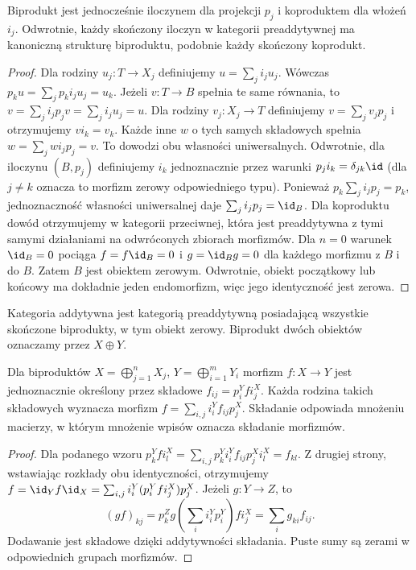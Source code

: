 \begin{twierdzenie}\label{cat:thm:biproduct-universal}
Biprodukt jest jednocześnie iloczynem dla projekcji $p_j$ i koproduktem dla włożeń $i_j$. Odwrotnie, każdy skończony iloczyn w kategorii preaddytywnej ma kanoniczną strukturę biproduktu, podobnie każdy skończony koprodukt.
\end{twierdzenie}
\begin{proof}
Dla rodziny $u_j:T\to X_j$ definiujemy $u=\sum_j i_ju_j$. Wówczas $p_ku=\sum_j p_ki_ju_j=u_k$. Jeżeli $v:T\to B$ spełnia te same równania, to $v=\sum_j i_jp_jv=\sum_j i_ju_j=u$. Dla rodziny $v_j:X_j\to T$ definiujemy $v=\sum_j v_jp_j$ i otrzymujemy $vi_k=v_k$. Każde inne $w$ o tych samych składowych spełnia $w=\sum_j wi_jp_j=v$. To dowodzi obu własności uniwersalnych.
Odwrotnie, dla iloczynu $(B,p_j)$ definiujemy $i_k$ jednoznacznie przez warunki $p_ji_k=\delta_{jk}\id$ (dla $j\ne k$ oznacza to morfizm zerowy odpowiedniego typu). Ponieważ $p_k\sum_j i_jp_j=p_k$, jednoznaczność własności uniwersalnej daje $\sum_j i_jp_j=\id_B$. Dla koproduktu dowód otrzymujemy w kategorii przeciwnej, która jest preaddytywna z tymi samymi działaniami na odwróconych zbiorach morfizmów.
Dla $n=0$ warunek $\id_B=0$ pociąga $f=f\id_B=0$ i $g=\id_Bg=0$ dla każdego morfizmu z $B$ i do $B$. Zatem $B$ jest obiektem zerowym. Odwrotnie, obiekt początkowy lub końcowy ma dokładnie jeden endomorfizm, więc jego identyczność jest zerowa.
\end{proof}
\begin{definicja}\label{cat:def:additive}
Kategoria addytywna jest kategorią preaddytywną posiadającą wszystkie skończone biprodukty, w tym obiekt zerowy. Biprodukt dwóch obiektów oznaczamy przez $X\oplus Y$.
\end{definicja}
\begin{stwierdzenie}\label{cat:prop:additive-matrices}
Dla biproduktów $X=\bigoplus_{j=1}^nX_j$, $Y=\bigoplus_{i=1}^mY_i$ morfizm $f:X\to Y$ jest jednoznacznie określony przez składowe $f_{ij}=p_i^Yfi_j^X$. Każda rodzina takich składowych wyznacza morfizm $f=\sum_{i,j}i_i^Y f_{ij}p_j^X$. Składanie odpowiada mnożeniu macierzy, w którym mnożenie wpisów oznacza składanie morfizmów.
\end{stwierdzenie}
\begin{proof}
Dla podanego wzoru $p_k^Yfi_l^X=\sum_{i,j}p_k^Yi_i^Y f_{ij}p_j^Xi_l^X=f_{kl}$. Z drugiej strony, wstawiając rozkłady obu identyczności, otrzymujemy
$f=\id_Y f\id_X=\sum_{i,j}i_i^Y(p_i^Yfi_j^X)p_j^X$.
Jeżeli $g:Y\to Z$, to
\[
 (gf)_{kj}=p_k^Zg\left(\sum_i i_i^Yp_i^Y\right)fi_j^X
 =\sum_i g_{ki}f_{ij}.
\]
Dodawanie jest składowe dzięki addytywności składania. Puste sumy są zerami w odpowiednich grupach morfizmów.
\end{proof}

